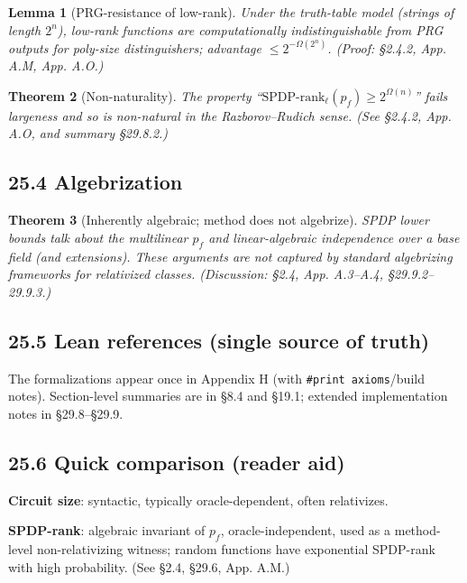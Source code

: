 \documentclass[12pt]{article}
\newtheorem{theorem}{Theorem}
\newtheorem{lemma}[theorem]{Lemma}
\theoremstyle{definition}
\theoremstyle{definition}
\theoremstyle{remark}
\theoremstyle{remark}
\begin{document}
\begin{lemma}[PRG-resistance of low-rank]\label{lem:prg-resistance-concise}
Under the truth-table model (strings of length $2^n$), low-rank functions are computationally indistinguishable from PRG outputs for poly-size distinguishers; advantage $\leq 2^{-\Omega(2^n)}$. (Proof: \S2.4.2, App. A.M, App. A.O.)
\end{lemma}

\begin{theorem}[Non-naturality]\label{thm:non-naturality-concise}
The property ``$\text{SPDP-rank}_\ell(p_f) \geq 2^{\Omega(n)}$'' fails largeness and so is non-natural in the Razborov--Rudich sense. (See \S2.4.2, App. A.O, and summary \S29.8.2.)
\end{theorem}

\subsection{25.4 Algebrization}

\begin{theorem}[Inherently algebraic; method does not algebrize]\label{thm:inherently-algebraic}
SPDP lower bounds talk about the multilinear $p_f$ and linear-algebraic independence over a base field (and extensions). These arguments are not captured by standard algebrizing frameworks for relativized classes. (Discussion: \S2.4, App. A.3--A.4, \S29.9.2--29.9.3.)
\end{theorem}

\subsection{25.5 Lean references (single source of truth)}

The formalizations appear once in Appendix H (with \texttt{\#print axioms}/build notes). Section-level summaries are in \S8.4 and \S19.1; extended implementation notes in \S29.8--\S29.9.

\subsection{25.6 Quick comparison (reader aid)}

\textbf{Circuit size}: syntactic, typically oracle-dependent, often relativizes.

\textbf{SPDP-rank}: algebraic invariant of $p_f$, oracle-independent, used as a method-level non-relativizing witness; random functions have exponential SPDP-rank with high probability. (See \S2.4, \S29.6, App. A.M.)
\end{document}
